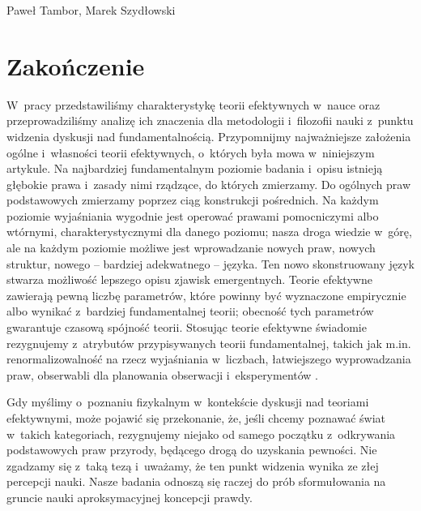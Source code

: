 \begin{artplenv}{Paweł Tambor, Marek Szydłowski}
\section{Zakończenie}
W~pracy przedstawiliśmy charakterystykę teorii efektywnych w~nauce oraz przeprowadziliśmy analizę ich znaczenia dla metodologii i~filozofii nauki z~punktu widzenia dyskusji nad fundamentalnością. Przypomnijmy najważniejsze założenia ogólne i~własności teorii efektywnych, o~których była mowa w~niniejszym artykule. Na najbardziej fundamentalnym poziomie badania i~opisu istnieją głębokie prawa i~zasady nimi rządzące, do których zmierzamy. Do ogólnych praw podstawowych zmierzamy poprzez ciąg konstrukcji pośrednich. Na każdym poziomie wyjaśniania wygodnie jest operować prawami pomocniczymi albo wtórnymi, charakterystycznymi dla danego poziomu; nasza droga wiedzie w~górę, ale na każdym poziomie możliwe jest wprowadzanie nowych praw, nowych struktur, nowego -- bardziej adekwatnego -- języka. Ten nowo skonstruowany język stwarza możliwość lepszego opisu zjawisk emergentnych. Teorie efektywne zawierają pewną liczbę parametrów, które powinny być wyznaczone empirycznie albo wynikać z~bardziej fundamentalnej teorii; obecność tych parametrów gwarantuje czasową spójność teorii. Stosując teorie efektywne świadomie rezygnujemy z~atrybutów przypisywanych teorii fundamentalnej, takich jak m.in. renormalizowalność na rzecz wyjaśniania w~liczbach, łatwiejszego wyprowadzania praw, obserwabli dla planowania obserwacji i~eksperymentów
\parencite[][]{butterfield_renormalization_2015}.%


Gdy myślimy o~poznaniu fizykalnym w~kontekście dyskusji nad teoriami efektywnymi, może pojawić się przekonanie, że, jeśli chcemy poznawać świat w~takich kategoriach, rezygnujemy niejako od samego początku z~odkrywania podstawowych praw przyrody, będącego drogą do uzyskania pewności. Nie zgadzamy się z~taką tezą i~uważamy, że ten punkt widzenia wynika ze złej percepcji nauki. Nasze badania odnoszą się raczej do prób sformułowania na gruncie nauki aproksymacyjnej koncepcji prawdy.


\end{artplenv}
